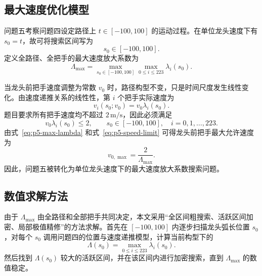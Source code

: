\subsection{最大速度优化模型}

问题五考察问题四设定路径上 $t\in[-100,100]$ 的运动过程。在单位龙头速度下有 $s_0=t$，故可将搜索区间写为
\begin{equation}
    s_0\in[-100,100].
    \label{eq:p5-range}
\end{equation}
定义全路径、全把手的最大速度放大系数为
\begin{equation}
    \Lambda_{\max}
    =
    \max_{s_0\in[-100,100]}
    \max_{0\le i\le223}
    \lambda_i(s_0).
    \label{eq:p5-max-lambda}
\end{equation}

当龙头前把手速度调整为常数 $v_0$ 时，路径构型不变，只是时间尺度发生线性变化。由速度递推关系的线性性，第 $i$ 个把手实际速度为
\begin{equation}
    v_i(s_0;v_0)=v_0\lambda_i(s_0).
    \label{eq:p5-actual-speed}
\end{equation}
题目要求所有把手速度均不超过 $2\,\mathrm{m/s}$，因此必须满足
\begin{equation}
    v_0\lambda_i(s_0)\le2,
    \qquad
    s_0\in[-100,100],\quad i=0,1,\ldots,223.
    \label{eq:p5-speed-limit}
\end{equation}
由式~\eqref{eq:p5-max-lambda} 和式~\eqref{eq:p5-speed-limit} 可得龙头前把手最大允许速度为
\begin{equation}
    v_{0,\max}=\frac{2}{\Lambda_{\max}}.
    \label{eq:p5-vmax}
\end{equation}
因此，问题五被转化为单位龙头速度下的最大速度放大系数搜索问题。

\subsection{数值求解方法}

由于 $\Lambda_{\max}$ 由全路径和全部把手共同决定，本文采用“全区间粗搜索、活跃区间加密、局部极值精修”的方法求解。首先在 $[-100,100]$ 内逐步扫描龙头弧长位置 $s_0$，对每个 $s_0$ 调用问题四的位置与速度递推模型，计算当前构型下的
\[
    \Lambda(s_0)=\max_{0\le i\le223}\lambda_i(s_0).
\]
然后找到 $\Lambda(s_0)$ 较大的活跃区间，并在该区间内进行加密搜索，直到 $\Lambda_{\max}$ 的数值稳定。

